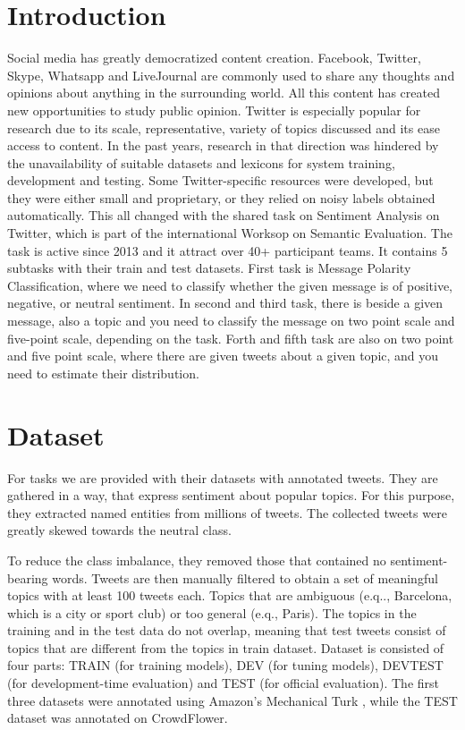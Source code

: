 \documentclass[runningheads,a4paper]{llncs}
\begin{document}
\section{Introduction}
Social media has greatly democratized content creation. Facebook, Twitter, Skype, Whatsapp and LiveJournal are commonly used to share any thoughts and opinions about anything in the surrounding world. All this content has created new opportunities to study public opinion. Twitter is especially popular for research due to its scale, representative, variety of topics discussed and its ease access to content. In the past years, research in that direction was hindered by the unavailability of suitable datasets and lexicons for system training, development and testing. Some Twitter-specific resources were developed, but they were either small and proprietary, or they relied on noisy labels obtained automatically. This all changed with the shared task on Sentiment Analysis on Twitter, which is part of the international Worksop on Semantic Evaluation. The task is active since 2013 and it attract over 40+ participant teams. It contains 5 subtasks with their train and test datasets. First task is Message Polarity Classification, where we need to classify whether the given message is of positive, negative, or neutral sentiment. In second and third task, there is beside a given message, also a topic and you need to classify the message on two point scale and five-point scale, depending on the task. Forth and fifth task are also on two point and five point scale, where there are given tweets about a given topic, and you need to estimate their distribution.



\section{Dataset}
 For tasks we are provided with their datasets with annotated tweets. They are gathered in a way, that express sentiment about popular topics. For this purpose, they extracted named entities from millions of tweets. The collected tweets were greatly skewed towards the neutral class. 
 
 To reduce the class imbalance, they removed those that contained no sentiment-bearing words. Tweets are then manually filtered to obtain a set of meaningful topics with at least 100 tweets each. Topics that are ambiguous (e.q.., Barcelona, which is a city or sport club) or too general (e.q., Paris). The topics in the training and in the test data do not overlap, meaning that test tweets consist of topics that are different from the topics in train dataset. Dataset is consisted of four parts: TRAIN (for training models), DEV (for tuning models), DEVTEST (for development-time evaluation) and TEST (for official evaluation). The first three datasets were annotated using Amazon's Mechanical Turk , while the TEST dataset was annotated on CrowdFlower. 
\end{document}
